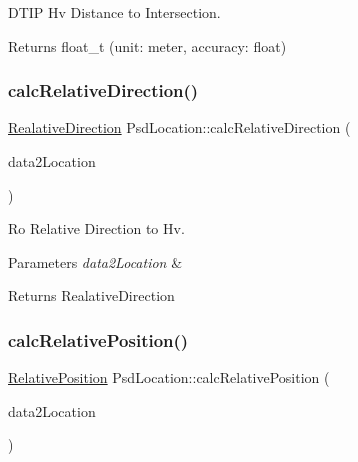 D\+T\+IP Hv Distance to Intersection. 

\begin{DoxyReturn}{Returns}
float\+\_\+t (unit\+: meter, accuracy\+: float) 
\end{DoxyReturn}
\mbox{\label{class_psd_location_afb451818c3fd9ff5e260270365bf165f}} 
\subsubsection{\texorpdfstring{calc\+Relative\+Direction()}{calcRelativeDirection()}}
{\footnotesize\ttfamily \hyperlink{_psd_location_8h_ae65d9d286580719610837075ffad7232}{Realative\+Direction} Psd\+Location\+::calc\+Relative\+Direction (\begin{DoxyParamCaption}\item[{\hyperlink{_psd_location_8h_a1e3a92020005d2a81aa50ba5ae9b129c}{Data2\+Location}}]{data2\+Location }\end{DoxyParamCaption})}



Ro Relative Direction to Hv. 


\begin{DoxyParams}{Parameters}
{\em data2\+Location} & \\
\hline
\end{DoxyParams}
\begin{DoxyReturn}{Returns}
Realative\+Direction 
\end{DoxyReturn}
\mbox{\label{class_psd_location_a3b1402df4271f1470603a82a4fe03b68}} 
\subsubsection{\texorpdfstring{calc\+Relative\+Position()}{calcRelativePosition()}}
{\footnotesize\ttfamily \hyperlink{_psd_location_8h_abcb85fd51379afdf750bdda1dec9174c}{Relative\+Position} Psd\+Location\+::calc\+Relative\+Position (\begin{DoxyParamCaption}\item[{\hyperlink{_psd_location_8h_a1e3a92020005d2a81aa50ba5ae9b129c}{Data2\+Location}}]{data2\+Location }\end{DoxyParamCaption})}



